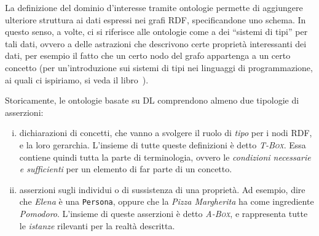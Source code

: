 La definizione del dominio d'interesse tramite ontologie permette di aggiungere ulteriore struttura ai dati espressi nei grafi RDF, specificandone uno schema.
In questo senso, a volte, ci si riferisce alle ontologie come a dei “sistemi di tipi” per tali dati, ovvero a delle astrazioni che descrivono certe proprietà interessanti dei dati, per esempio il fatto che un certo nodo del grafo appartenga a un certo concetto (per un'introduzione sui sistemi di tipi nei linguaggi di programmazione, ai quali ci ispiriamo, si veda il libro~\cite{pierceTypesBook}). 

Storicamente, le ontologie basate su DL comprendono almeno due tipologie di asserzioni:
\begin{enumerate}[i)]
	\item dichiarazioni di concetti, che vanno a svolgere il ruolo di \textit{tipo} per i nodi RDF, e la loro gerarchia. L'insieme di tutte queste definizioni è detto \textsc{\itshape T-Box}. Essa contiene quindi tutta la parte di terminologia, ovvero le \textit{condizioni necessarie e sufficienti} per un elemento di far parte di un concetto.
	\item asserzioni sugli individui o di sussistenza di una proprietà. Ad esempio, dire che \textsl{Elena} è una \texttt{Persona}, oppure che la \textsl{Pizza Margherita} ha come ingrediente \textsl{Pomodoro}. L'insieme di queste asserzioni è detto \textsc{\itshape A-Box}, e rappresenta tutte le \textit{istanze} rilevanti per la realtà descritta.
\end{enumerate}